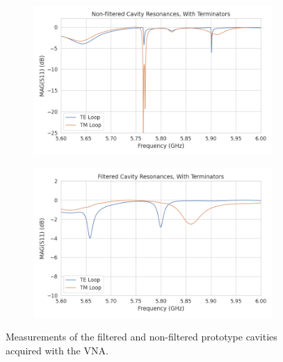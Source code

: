 \begin{figure}[htbp]
\begin{subfigure}{0.48\textwidth}
        \caption{}
    \end{subfigure}
    \hfill
    \begin{subfigure}{0.48\textwidth}
        \includegraphics*[width=\textwidth]{figs/Chapter-6/230613_TETM_nofilter_cav_with_term.png}
        \caption{}
    \end{subfigure}
    \hfill
    \begin{subfigure}{0.48\textwidth}
        \includegraphics*[width=\textwidth]{figs/Chapter-6/230613_TETM_filter_cav_with_term.png}
        \caption{}
    \end{subfigure}
    \caption{\label{fig:chap6-cav-measurements-no-term} Measurements of the filtered and non-filtered prototype cavities acquired with the VNA.}
\end{figure}

